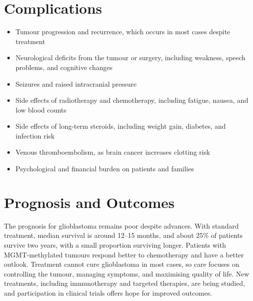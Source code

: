 \section*{Complications}
\begin{itemize}
    \item Tumour progression and recurrence, which occurs in most cases despite treatment
    \item Neurological deficits from the tumour or surgery, including weakness, speech problems, and cognitive changes
    \item Seizures and raised intracranial pressure
    \item Side effects of radiotherapy and chemotherapy, including fatigue, nausea, and low blood counts
    \item Side effects of long-term steroids, including weight gain, diabetes, and infection risk
    \item Venous thromboembolism, as brain cancer increases clotting risk
    \item Psychological and financial burden on patients and families
\end{itemize}

\section*{Prognosis and Outcomes}
The prognosis for glioblastoma remains poor despite advances. With standard treatment, median survival is around 12--15 months, and about 25\% of patients survive two years, with a small proportion surviving longer. Patients with MGMT-methylated tumours respond better to chemotherapy and have a better outlook. Treatment cannot cure glioblastoma in most cases, so care focuses on controlling the tumour, managing symptoms, and maximising quality of life. New treatments, including immunotherapy and targeted therapies, are being studied, and participation in clinical trials offers hope for improved outcomes.

